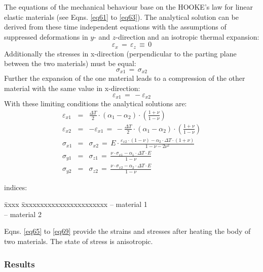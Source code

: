 The equations of the mechanical behaviour base on the HOOKE's law for linear elastic materials (see Eqns. \ref{eq61} to \ref{eq63}). The analytical solution can be derived from these time independent equations with the assumptions of suppressed deformations in $y$- and $z$-direction and an isotropic thermal expansion:
\begin{displaymath}
\varepsilon_x\,=\,\varepsilon_z\,\equiv\,0
\end{displaymath}
Additionally the stresses in x-direction (perpendicular to the parting plane between the two materials) must be equal:
\begin{displaymath}
\sigma_{x1}\,=\,\sigma_{x2}
\end{displaymath}
Further the expansion of the one material leads to a compression of the other material with the same value in x-direction:
\begin{displaymath}
\varepsilon_{x1}\,=\,-\varepsilon_{x2}
\end{displaymath}
With these limiting conditions the analytical solutions are:
\begin{eqnarray}
\varepsilon_{x1} & = &
\frac{\Delta T}{2}\cdot\left(\alpha_1-\alpha_2\right)\cdot
\left(\frac{1+\nu}{1-\nu}\right)
\label{eq65} \\[1.5ex]
\varepsilon_{x2} & = & -\varepsilon_{x1}\,=\,
-\frac{\Delta T}{2}\cdot\left(\alpha_1-\alpha_2\right)\cdot
\left(\frac{1+\nu}{1-\nu}\right)
\label{eq66} \\[1.5ex]
\sigma_{x1} & = & \sigma_{x2}\,=\, E\cdot
\frac{\varepsilon_{x2}\cdot\left(1-\nu\right)-\alpha_2\cdot\Delta T\cdot\left(1+\nu\right)}{1-\nu-2\nu^2}
\label{eq67} \\[1.5ex]
\sigma_{y1} & = & \sigma_{z1}\,=\,
\frac{\nu\cdot\sigma_{x1}-\alpha_1\cdot\Delta T\cdot E}{1-\nu}
\label{eq68} \\[1.5ex]
\sigma_{y2} & = & \sigma_{z2}\,=\,
\frac{\nu\cdot\sigma_{x2}-\alpha_2\cdot\Delta T\cdot E}{1-\nu}
\label{eq69}
\end{eqnarray}
{\small
indices:

\begin{tabbing}
\=xxxx  \=xxxxxxxxxxxxxxxxxxxxxxx \kill
{} -- \> material 1 \\[1.0ex]
 -- \> material 2
\end{tabbing}
}

Eqns. \ref{eq65} to \ref{eq69} provide the strains and stresses after heating the body of two materials. The state of stress is anisotropic.

\subsubsection{Results}

